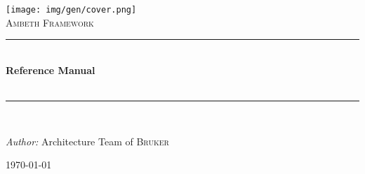 \ifpdf
\begin{titlepage}

\begin{center}


\texttt{[image: img/gen/cover.png]}\\[1cm]

\textsc{\huge Ambeth Framework}\\[1.5cm]

\newcommand{\HRule}{\rule{\linewidth}{0.5mm}}
\HRule \\[0.4cm]
{ \huge \bfseries Reference Manual}\\[0.4cm]
{ \huge \bfseries \version}\\[0.4cm]
\HRule \\[1.5cm]

\begin{minipage}{0.5\textwidth}
\begin{flushleft} \large
\emph{Author:} Architecture Team of \textsc{Bruker}\\
\end{flushleft}
\end{minipage}

\vfill

{\large \today}

\end{center}

\end{titlepage}
\fi